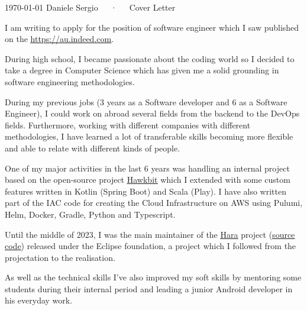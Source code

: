 \documentclass[11pt, a4paper]{awesome-cv}
\begin{document}
\makecvheader[R]

\makecvfooter
  {\today}
  {Daniele Sergio~~~·~~~Cover Letter}
  {}

\makelettertitle

\begin{cvletter}
I am writing to apply for the position of software engineer which I saw published on the \href{https://au.indeed.com/cmp/Acira-Consultancy-Pty-Ltd/jobs?jk=89acba6020eca2ce&start=0}{\underline{https://au.indeed.com}}.

During high school, I became passionate about the coding world so I decided to take a degree in Computer Science which has given me a solid grounding in software engineering methodologies.

During my previous jobs (3 years as a Software developer and 6 as a Software Engineer), I could work on abroad several fields from the backend to the DevOps fields. Furthermore, working with different companies with different methodologies, I have learned a lot of transferable skills becoming more flexible and able to relate with different kinds of people.

One of my major activities in the last 6 years was handling an internal project based on the open-source project \href{https://eclipse.dev/hawkbit/}{\underline{Hawkbit}} which I extended with some custom features written in Kotlin (Spring Boot) and Scala (Play). I have also written part of the IAC code for creating the Cloud Infrastructure on AWS using Pulumi, Helm, Docker, Gradle, Python and Typescript.

Until the middle of 2023, I was the main maintainer of the \href{https://projects.eclipse.org/projects/iot.hawkbit.hara}{\underline{Hara}} project (\href{https://github.com/eclipse-hara/hara-ddiclient}{\underline{source code}}) released under the Eclipse foundation, a project which I followed from the projectation to the realisation.

As well as the technical skills I’ve also improved my soft skills by mentoring some students during their internal period and leading a junior Android developer in his everyday work.


\end{cvletter}
\end{document}
